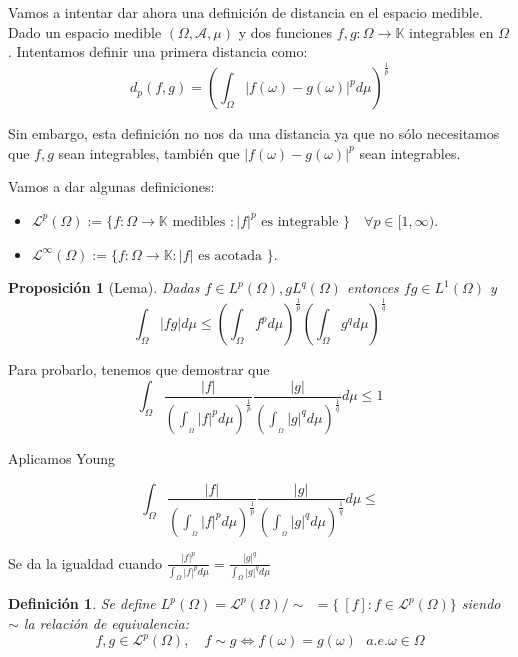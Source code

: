\documentclass[11pt, a4paper]{article}
\makeatletter
\newif\IfInSansMode
\let\oldsf\sffamily
\renewcommand*{\sffamily}{\oldsf\mathversion{sans}\InSansModetrue}
\let\oldnorm\normalfont
\renewcommand*{\normalfont}{\oldnorm\InSansModefalse\mathversion{normal}}
\providecommand{\abs}[1]{\lvert#1\rvert}
\renewenvironment{proof}[1][\proofname] {\par\pushQED{\qed}\normalfont\topsep6\p@\@plus6\p@\relax\trivlist\item[\hskip\labelsep\itshape\sffamily#1\@addpunct{.}]\ignorespaces}{\popQED\endtrivlist\@endpefalse}
\theoremstyle{theorem-style}
\newtheorem{nprop}{Proposición}[section]
\theoremstyle{definition-style}
\newtheorem{ndef}{Definición}[section]
\theoremstyle{remark-style}
\theoremstyle{example-style}
\makeatother
\begin{document}
Vamos a intentar dar ahora una definición de distancia en el espacio medible. Dado un espacio medible $(\Omega, \mathscr A, \mu)$ y dos funciones $f, g: \Omega \rightarrow \mathbb K$ integrables en $\Omega$. Intentamos definir una primera distancia como:
$$d_p (f, g) = \left( \int_{\Omega} \abs{f(\omega) - g(\omega)}^p d \mu \right)^{\frac{1}{p}}$$

Sin embargo, esta definición no nos da una distancia ya que no sólo necesitamos que $f, g$ sean integrables, también que $\abs{f(\omega) - g(\omega)}^p$ sean integrables.

Vamos a dar algunas definiciones:

\begin{itemize}
\item $\mathcal L^p (\Omega) := \{ f: \Omega \rightarrow \mathbb K \text{ medibles } : \abs{f}^p \text{ es integrable } \}\quad \forall p \in [1, \infty)$.
\item $\mathcal L^{\infty} (\Omega) := \{ f: \Omega \rightarrow \mathbb K : \abs{f} \text{ es acotada } \}$.
\end{itemize}

\begin{nprop}[Lema]
  Dadas $f \in L^p (\Omega), g L^q (\Omega)$ entonces $fg \in L^1 (\Omega)$ y $$ \displaystyle \int_{\Omega} \abs{fg}d \mu \leq \left( \int_{\Omega} f^p d \mu \right)^{\frac{1}{p}}\left( \int_{\Omega} g^q d \mu \right)^{\frac{1}{q}}$$
\end{nprop}

\begin{proof}
  Para probarlo, tenemos que demostrar que $$ \int_{\Omega} \frac{|f|}{\left( \int_{_\Omega} |f|^p d \mu \right)^{\frac{1}{p}}} \frac{|g|}{\left( \int_{_\Omega} |g|^q d \mu \right)^{\frac{1}{q}}} d \mu \leq 1$$
  
  Aplicamos Young
  
  $$\int_{\Omega} \frac{|f|}{\left( \int_{_\Omega} |f|^p d \mu \right)^{\frac{1}{p}}} \frac{|g|}{\left( \int_{_\Omega} |g|^q d \mu \right)^{\frac{1}{q}}} d \mu \leq $$
  
  
  Se da la igualdad cuando $\displaystyle \frac{|f|^p}{\int_{\Omega} |f|^p d \mu } = \frac{|g|^q}{\int_{\Omega} |g|^q d \mu }$
\end{proof}

\begin{ndef}
  Se define $L^p(\Omega) = \mathcal{L}^p(\Omega)/\sim \ \ = \{ \ [f] : f \in \mathcal{L}^p(\Omega) \} $ siendo $\sim$ la relación de equivalencia:
  \[
    f,g\in \mathcal{L}^p(\Omega), \quad f\sim  g \iff f(\omega)= g(\omega) \ \ \ a.e. \omega \in \Omega
  \]
  
\end{ndef}
\end{document}
